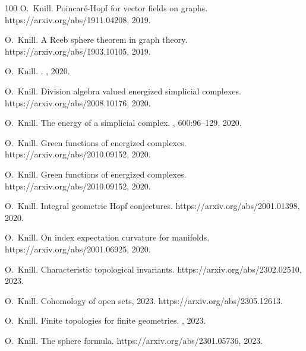 \documentclass[12pt]{amsart}
\begin{document}
\begin{thebibliography}{100}
O.~Knill.
\newblock Poincar{\'e}-{H}opf for vector fields on graphs.
\newblock {\\}https://arxiv.org/abs/1911.04208, 2019.

O.~Knill.
\newblock A {R}eeb sphere theorem in graph theory.
\newblock {\\}https://arxiv.org/abs/1903.10105, 2019.

O.~Knill.
.
, 2020.

O.~Knill.
\newblock Division algebra valued energized simplicial complexes.
\newblock https://arxiv.org/abs/2008.10176, 2020.

O.~Knill.
\newblock The energy of a simplicial complex.
, 600:96--129, 2020.

O.~Knill.
\newblock Green functions of energized complexes.
\newblock {\\}https://arxiv.org/abs/2010.09152, 2020.

O.~Knill.
\newblock Green functions of energized complexes.
\newblock https://arxiv.org/abs/2010.09152, 2020.

O.~Knill.
\newblock Integral geometric {H}opf conjectures.
\newblock https://arxiv.org/abs/2001.01398, 2020.

O.~Knill.
\newblock On index expectation curvature for manifolds.
\newblock https://arxiv.org/abs/2001.06925, 2020.

O.~Knill.
\newblock Characteristic topological invariants.
\newblock https://arxiv.org/abs/2302.02510, 2023.

O.~Knill.
\newblock Cohomology of open sets, 2023.
\newblock https://arxiv.org/abs/2305.12613.

O.~Knill.
\newblock Finite topologies for finite geometries.
, 2023.

O.~Knill.
\newblock The sphere formula.
\newblock https://arxiv.org/abs/2301.05736, 2023.


\end{thebibliography}
\end{document}
